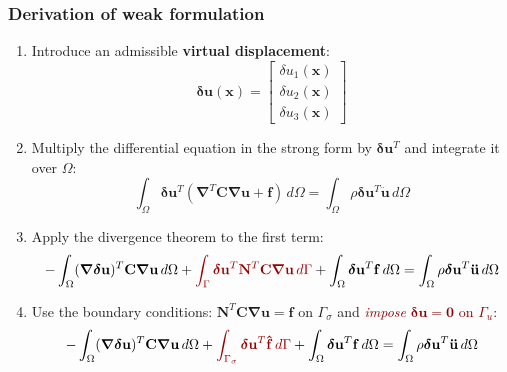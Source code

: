 \documentclass[aspectratio=169]{beamer}
\begin{document}
\begin{frame}
  \small
  \frametitle{Derivation of weak formulation}
  \begin{enumerate}
    \item Introduce an admissible \textbf{virtual displacement}:
          $$\boldsymbol\delta\mathbf u(\mathbf x)=\begin{bmatrix}\delta u_1(\mathbf x)\\ \delta u_2(\mathbf x)\\ \delta u_3(\mathbf x) \end{bmatrix}$$
    \item Multiply the differential equation in the strong form by $\boldsymbol\delta\mathbf u^{T}$ and integrate it over $\Omega$:
          $$\int_\Omega\boldsymbol\delta\mathbf u^{T}(\boldsymbol\nabla^T\mathbf C\boldsymbol\nabla \mathbf u+\mathbf f)\, d\Omega=\int_\Omega\rho\boldsymbol\delta\mathbf u^{T}\mathbf{\ddot{u}}\, d\Omega$$
    \item Apply the divergence theorem to the first term:
          $$-\int_\Omega (\boldsymbol\nabla\boldsymbol \delta\mathbf u)^{T} \mathbf C\boldsymbol\nabla \mathbf u\, d\Omega+{\color{darkred}\int_\Gamma \boldsymbol\delta\mathbf u^{T} \mathbf N^T\mathbf C\boldsymbol\nabla \mathbf  u\, d\Gamma}+\int_\Omega \boldsymbol\delta\mathbf u^{T}\mathbf f\, d\Omega=\int_\Omega\rho\boldsymbol\delta\mathbf u^{T} \mathbf{\ddot{u}}\, d\Omega$$
    \item Use the boundary conditions: $\mathbf N^T\mathbf  C\boldsymbol\nabla\mathbf  u=\mathbf{\hat f}$ on  $\Gamma_\sigma$ and \textcolor{darkred}{\emph{impose} $\boldsymbol\delta\mathbf u=\mathbf 0$ on $\Gamma_{u}$}:
          $$-\int_\Omega (\boldsymbol\nabla \boldsymbol\delta\mathbf u)^{T} \mathbf C\boldsymbol\nabla \mathbf u\, d\Omega+{\color{darkred}\int_{\Gamma_{\sigma}} \boldsymbol\delta\mathbf u^{T} \mathbf{\hat f}\, d\Gamma}+\int_\Omega \boldsymbol\delta\mathbf u^{T}\mathbf f\, d\Omega=\int_\Omega\rho\boldsymbol\delta\mathbf u^{T} \mathbf{\ddot{u}}\, d\Omega$$
  \end{enumerate}
\end{frame}
\end{document}
